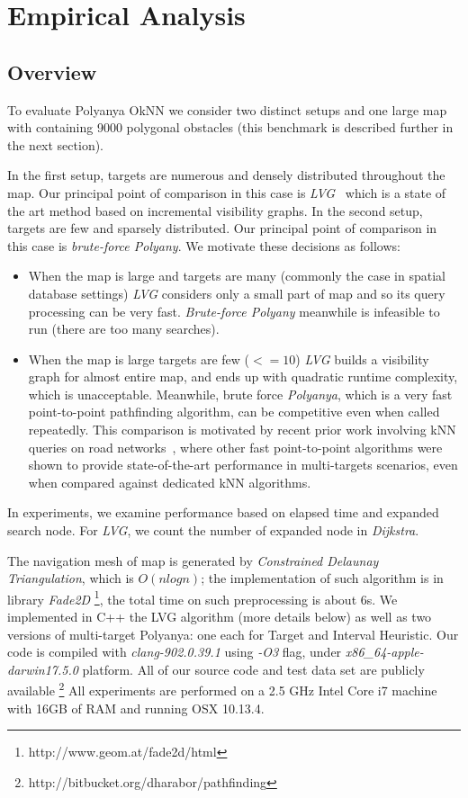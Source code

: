 \chapter{Empirical Analysis}\label{empirical}
\section{Overview}\label{expoverview}
To evaluate Polyanya OkNN we consider two distinct setups and one large map with 
containing 9000 polygonal obstacles (this benchmark is described further in the next section).

In the first setup, targets are numerous and densely distributed throughout
the map. Our principal point of comparison in this case is \textit{LVG}~\cite{zhang2004spatial} which
is a state of the art method based on incremental visibility graphs. 
In the second setup, targets are few and sparsely distributed.
Our principal point of comparison in this case is \textit{brute-force Polyany}.
We motivate these decisions as follows:

\begin{itemize}[leftmargin=1cm]
\item When the map is large and targets are many (commonly the case in spatial database settings) \textit{LVG} considers only a small part of map and so its query processing can be very fast.
  \textit{Brute-force Polyany} meanwhile is infeasible to run (there are too many searches).

\item When the map is large targets are few ($<=10$) \textit{LVG} builds a visibility graph for almost entire map,
  and ends up with quadratic runtime complexity, which is unacceptable.
    Meanwhile, brute force \textit{Polyanya}, which is a very fast point-to-point pathfinding algorithm,
    can be competitive even when called repeatedly.
    This comparison is motivated by recent prior work involving kNN queries on road networks~\cite{abeywickrama2016k},
    where other fast point-to-point algorithms were shown to provide state-of-the-art performance in multi-targets scenarios,
    even when compared against dedicated kNN algorithms.
\end{itemize}

In experiments, we examine performance based on elapsed time and expanded search node.
For \textit{LVG}, we count the number of expanded node in \textit{Dijkstra}.

The navigation mesh of map is generated by \textit{Constrained Delaunay Triangulation}, which is $O(nlogn)$;
the implementation of such algorithm is in library \textit{Fade2D} \footnote{http://www.geom.at/fade2d/html},
the total time on such preprocessing is about 6s.
We implemented in C++ the LVG algorithm (more details below) as well as two versions of multi-target Polyanya:
one each for Target and Interval Heuristic.
Our code is compiled with \textit{clang-902.0.39.1} using \textit{-O3} flag,
under \textit{x86\_64-apple-darwin17.5.0} platform.
All of our source code and test data set are  publicly available \footnote{http://bitbucket.org/dharabor/pathfinding}
All experiments are performed on a 2.5 GHz Intel Core i7 machine with 16GB of RAM and running OSX 10.13.4. 



